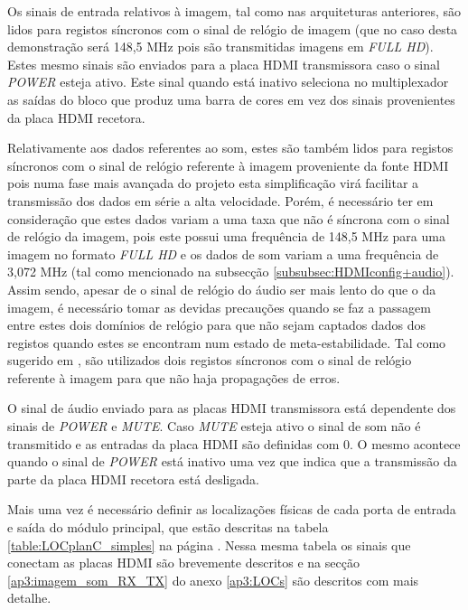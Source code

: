 
Os sinais de entrada relativos à imagem, tal como nas arquiteturas anteriores, são lidos para registos síncronos com o sinal de relógio de imagem (que no caso desta demonstração será 148,5 MHz pois são transmitidas imagens em \textit{FULL HD}). Estes mesmo sinais são enviados para a placa HDMI transmissora caso o sinal \textit{POWER} esteja ativo. Este sinal quando está inativo seleciona no multiplexador as saídas do bloco que produz uma barra de cores em vez dos sinais provenientes da placa HDMI recetora.

Relativamente aos dados referentes ao som, estes são também lidos para registos síncronos com o sinal de relógio referente à imagem proveniente da fonte HDMI pois numa fase mais avançada do projeto esta simplificação virá facilitar a transmissão dos dados em série a alta velocidade. Porém, é necessário ter em consideração que estes dados variam a uma taxa que não é síncrona com o sinal de relógio da imagem, pois este possui uma frequência de 148,5 MHz para uma imagem no formato \textit{FULL HD} e os dados de som variam a uma frequência de 3,072 MHz (tal como mencionado na subsecção \ref{subsubsec:HDMIconfig+audio}). Assim sendo, apesar de o sinal de relógio do áudio ser mais lento do que o da imagem, é necessário tomar as devidas precauções quando se faz a passagem entre estes dois domínios de relógio para que não sejam captados dados dos registos quando estes se encontram num estado de meta-estabilidade. Tal como sugerido em \cite{R024}, são utilizados dois registos síncronos com o sinal de relógio referente à imagem para que não haja propagações de erros.

O sinal de áudio enviado para as placas HDMI transmissora está dependente dos sinais de \textit{POWER} e \textit{MUTE}. Caso \textit{MUTE} esteja ativo o sinal de som não é transmitido e as entradas da placa HDMI são definidas com 0. O mesmo acontece quando o sinal de \textit{POWER} está inativo uma vez que indica que a transmissão da parte da placa HDMI recetora está desligada.

Mais uma vez é necessário definir as localizações físicas de cada porta de entrada e saída do módulo principal, que estão descritas na tabela \ref{table:LOCplanC_simples} na página \pageref{table:LOCplanC_simples}. Nessa mesma tabela os sinais que conectam as placas HDMI são brevemente descritos e na secção \ref{ap3:imagem_som_RX_TX} do anexo \ref{ap3:LOCs} são descritos com mais detalhe.\\



